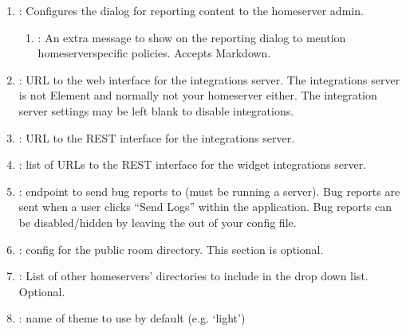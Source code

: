 \documentclass[letterpaper,10pt,openany,oneside,english]{sphinxmanual}
\begin{document}
\begin{enumerate}
\begin{enumerate}
\end{enumerate}

\item {} 
\sphinxAtStartPar
{}: Configures the dialog for reporting content to the homeserver
admin.
\begin{enumerate}
%
\item {} 
\sphinxAtStartPar
{}: An extra message to show on the reporting dialog to
mention homeserver\sphinxhyphen{}specific policies. Accepts Markdown.

\end{enumerate}

\item {} 
\sphinxAtStartPar
{}: URL to the web interface for the integrations server. The integrations
server is not Element and normally not your homeserver either. The integration server settings
may be left blank to disable integrations.

\item {} 
\sphinxAtStartPar
{}: URL to the REST interface for the integrations server.

\item {} 
\sphinxAtStartPar
{}: list of URLs to the REST interface for the widget integrations server.

\item {} 
\sphinxAtStartPar
{}: endpoint to send bug reports to (must be running a
 server). Bug reports are sent when a user clicks
“Send Logs” within the application. Bug reports can be disabled/hidden by leaving the
 out of your config file.

\item {} 
\sphinxAtStartPar
{}: config for the public room directory. This section is optional.

\item {} 
\sphinxAtStartPar
{}: List of other homeservers’ directories to include in the drop
down list. Optional.

\item {} 
\sphinxAtStartPar
{}: name of theme to use by default (e.g. ‘light’)


\end{enumerate}
\end{document}

